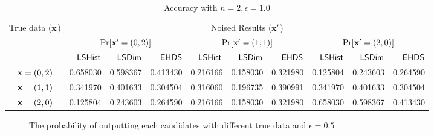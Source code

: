 \documentclass{article}
\begin{document}
\begin{table}[htbp]
	\tiny
	\centering
	\caption{Accuracy with $n = 2, \epsilon = 1.0$}
	\label{tab_n2eps1.0prob}
	\vspace{-0.2cm}
\begin{tabular}{|c||r|r|r|r|r|r|r|r|r|}
	\hline

	\multirow{3}{*}{True data ($\textbf{x}$)} 	
								&  \multicolumn{9}{c|}{Noised Results ($\textbf{x}'$)}  		
								\\ \cline{2-10}
	                      		&  \multicolumn{3}{c|}{$\Pr[\textbf{x}' = (0, 2)]$}  	
	                      		&  \multicolumn{3}{c|}{$\Pr[\textbf{x}' = (1, 1)]$} 	
	                      		&  \multicolumn{3}{c|}{$\Pr[\textbf{x}' = (2, 0)]$} 	\\
	                      		\cline{2-10}
						        & $\mathsf{LSHist}$	
								& $\mathsf{LSDim}$
								& $\mathsf{EHDS}$
								& $\mathsf{LSHist}$
								& $\mathsf{LSDim}$	
								& $\mathsf{EHDS}$
								& $\mathsf{LSHist}$
								& $\mathsf{LSDim}$
								& $\mathsf{EHDS}$\\
	                      		\hline \hline
	$\textbf{x} = (0,2)$          & 0.658030
								& 0.598367
								& 0.413430
								& 0.216166	
								& 0.158030
								& 0.321980
								& 0.125804
								& 0.243603	
								& 0.264590	
								\\  \hline
	$\textbf{x} = (1,1)$          & 0.341970
								& 0.401633	
								& 0.304504
								& 0.316060	
								& 0.196735	
								& 0.390991 
								& 0.341970
								& 0.401633	
								& 0.304504
								\\  \hline
	$\textbf{x} = (2,0)$          & 0.125804
								& 0.243603	
								& 0.264590
								& 0.216166
								& 0.158030
								& 0.321980
								& 0.658030	
								& 0.598367	
								& 0.413430	
								\\  \hline
\end{tabular}
\end{table}

\begin{figure*}[ht]
\begin{center}
\vspace{-0.5cm}
     \centering
      \caption{\footnotesize The probability of outputting each candidates with different true data and $\epsilon = 0.5$}
\end{center}
\end{figure*}
\end{document}
